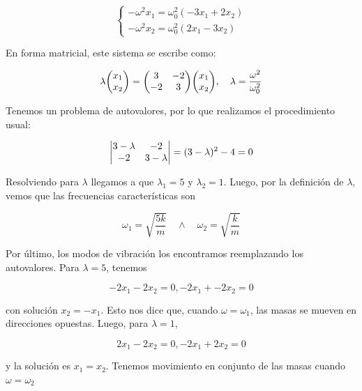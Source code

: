 \documentclass[11pt]{article}
\begin{document}
\begin{equation}
    \begin{cases}
        -\omega^2x_1 = \omega_0^2(-3x_1 + 2x_2) \\
        -\omega^2x_2 = \omega_0^2(2x_1 - 3x_2)
    \end{cases}
\end{equation}

En forma matricial, este sistema se escribe como:

\begin{equation}
    \lambda\mqty(x_1 \\ x_2) = \mqty(3 & -2 \\ -2 & 3) \mqty(x_1 \\ x_2) \qc \lambda=\frac{\omega^2}{\omega_0^2}
\end{equation}

Tenemos un problema de autovalores, por lo que realizamos el procedimiento usual:

\begin{equation}
    \mdet{3-\lambda & -2 \\ -2 & 3-\lambda} = (3-\lambda)^2 - 4 = 0
\end{equation}

Resolviendo para $\lambda$ llegamos a que $\lambda_1 = 5$ y $\lambda_2 = 1$. Luego, por la definición de $\lambda$, vemos que las frecuencias características son

\begin{equation}
    \omega_1 = \sqrt{\frac{5k}{m}} \quad\land\quad \omega_2 = \sqrt{\frac{k}{m}}
\end{equation}

Por último, los modos de vibración los encontramos reemplazando los autovalores. Para $\lambda = 5$, tenemos 

\begin{equation}
    -2x_1 - 2x_2 = 0, -2x_1 + -2x_2 = 0
\end{equation}

con solución $x_2 = -x_1$. Esto nos dice que, cuando $\omega = \omega_1$, las masas se mueven en direcciones opuestas. Luego, para $\lambda = 1$,

\begin{equation}
    2x_1 - 2x_2 = 0, -2x_1 + 2x_2 = 0
\end{equation}

y la solución es $x_1 = x_2$. Tenemos movimiento en conjunto de las masas cuando $\omega = \omega_2$
\end{document}
